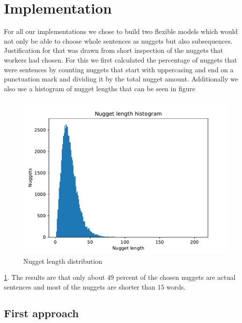 \documentclass{article}
\begin{document}
\section{Implementation}
\label{headings}


For all our implementations we chose to build two flexible models which would not only be able to choose whole sentences as nuggets but also subsequences. Justification for that was drawn from short inspection of the nuggets that workers had chosen. For this we first calculated the percentage of nuggets that were sentences by counting nuggets that start with uppercasing and end on a punctuation mark and dividing it by the total nugget amount. Additionally we also use a histogram of nugget lengths that can be seen in figure
\begin{figure}[!ht]
	\centering
	\includegraphics[width=0.55\linewidth]{Nugget_size.pdf}
	\caption{Nugget length distribution}
	\label{fig:nuggets}
\end{figure}
\ref{fig:nuggets}.
The results are that only about $49$ percent of the chosen nuggets are actual sentences and most of the nuggets are shorter than $15$ words.

\subsection{First approach}
\end{document}
